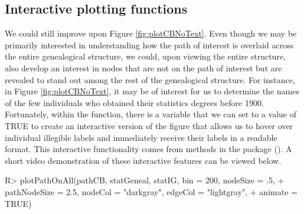 \documentclass[article,shortnames]{jss}
\begin{document}
\subsection{Interactive plotting functions}
\label{interaction}

We could still improve upon Figure \ref{fig:plotCBNoText}. Even though we may be primarily interested in understanding how the path of interest is overlaid across the entire genealogical structure, we could, upon viewing the entire structure, also develop an interest in nodes that are not on the path of interest but are revealed to stand out among the rest of the genealogical structure. For instance, in Figure \ref{fig:plotCBNoText}, it may be of interest for us to determine the names of the few individuals who obtained their statistics degrees before 1900. Fortunately, within the  function, there is a variable  that we can set to a value of TRUE to create an interactive version of the figure that allows us to hover over individual illegible labels and immediately receive their labels in a readable format. This interactive functionality comes from methods in the  package (\citealt{plotly}). A short video demonstration of these interactive features can be viewed below. 

\begin{CodeChunk}
\begin{CodeInput}
R> plotPathOnAll(pathCB, statGeneal, statIG, bin = 200, nodeSize = .5,
+    pathNodeSize = 2.5, nodeCol = "darkgray", edgeCol = "lightgray",
+    animate = TRUE)
\end{CodeInput}
\end{CodeChunk}
\end{document}
